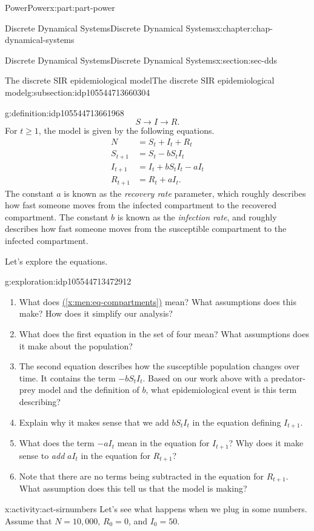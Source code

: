 \documentclass[oneside,10pt,]{book}
\newcommand{\xreffont}{\relax}
\numberwithin{equation}{section}
\renewcommand{\ge}{\geqslant}
\newcommand{\amp}{&}
\begin{document}
\begin{partptx}{Power}{}{Power}{}{}{x:part:part-power}
\begin{chapterptx}{Discrete Dynamical Systems}{}{Discrete Dynamical Systems}{}{}{x:chapter:chap-dynamical-systems}
\begin{sectionptx}{Discrete Dynamical Systems}{}{Discrete Dynamical Systems}{}{}{x:section:sec-dds}
\begin{subsectionptx}{The discrete SIR epidemiological model}{}{The discrete SIR epidemiological model}{}{}{g:subsection:idp105544713660304}
\begin{definition}{}{g:definition:idp105544713661968}
\begin{equation}
S \to I \to R.\label{x:men:eq-compartments}
\end{equation}
For \(t\ge 1\), the model is given by the following equations.%
%
\begin{align*}
N \amp = S_t + I_t + R_t\\
S_{t+1} \amp = S_t -b S_t I_t\\
I_{t+1} \amp = I_t + b S_t I_t - a I_t\\
R_{t+1} \amp = R_t + a I_t.
\end{align*}
The constant \(a\) is known as the \emph{recovery rate} parameter, which roughly describes how fast someone moves from the infected compartment to the recovered compartment. The constant \(b\) is known as the \emph{infection rate}, and roughly describes how fast someone moves from the susceptible compartment to the infected compartment.%
\end{definition}
Let's explore the equations.%
\begin{exploration}{}{g:exploration:idp105544713472912}%
%
\begin{enumerate}
\item{}What does \hyperref[x:men:eq-compartments]{({\xreffont\ref{x:men:eq-compartments}})} mean? What assumptions does this make? How does it simplify our analysis?%
\item{}What does the first equation in the set of four mean? What assumptions does it make about the population?%
\item{}The second equation describes how the susceptible population changes over time. It contains the term \(-b S_t I_t\). Based on our work above with a predator-prey model and the definition of \(b\), what epidemiological event is this term describing?%
\item{}Explain why it makes sense that we add \(b S_t I_t\) in the equation defining \(I_{t+1}\).%
\item{}What does the term \(-a I_t\) mean in the equation for \(I_{t+1}\)? Why does it make sense to \emph{add} \(a I_t\) in the equation for \(R_{t+1}\)?%
\item{}Note that there are no terms being subtracted in the equation for \(R_{t+1}\). What assumption does this tell us that the model is making?%
\end{enumerate}
\end{exploration}%
\begin{activity}{}{x:activity:act-sirnumbers}%
Let's see what happens when we plug in some numbers. Assume that \(N = 10,000\), \(R_0 = 0\), and \(I_0 = 50\).%

\end{activity}
\end{subsectionptx}
\end{sectionptx}
\end{chapterptx}
\end{partptx}
\end{document}
